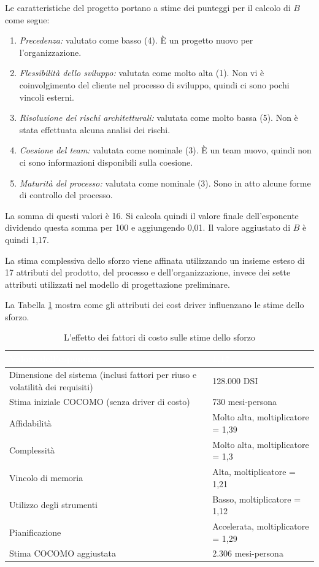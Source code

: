 Le caratteristiche del progetto portano a stime dei punteggi per il calcolo di $B$ come segue:
\begin{enumerate}
    \item \textit{Precedenza:} valutato come basso (4). È un progetto nuovo per l'organizzazione.
    \item \textit{Flessibilità dello sviluppo:} valutata come molto alta (1). Non vi è coinvolgimento del cliente nel processo di sviluppo, quindi ci sono pochi vincoli esterni.
    \item \textit{Risoluzione dei rischi architetturali:} valutata come molto bassa (5). Non è stata effettuata alcuna analisi dei rischi.
    \item \textit{Coesione del team:} valutata come nominale (3). È un team nuovo, quindi non ci sono informazioni disponibili sulla coesione.
    \item \textit{Maturità del processo:} valutata come nominale (3). Sono in atto alcune forme di controllo del processo.
\end{enumerate}
La somma di questi valori è 16. Si calcola quindi il valore finale dell'esponente dividendo questa somma per 100 e aggiungendo 0,01. Il valore aggiustato di $B$ è quindi 1,17.

La stima complessiva dello sforzo viene affinata utilizzando un insieme esteso di 17 attributi del prodotto, del processo e dell'organizzazione, invece dei sette attributi utilizzati nel modello di progettazione preliminare.

La Tabella \ref{tab:effect-cost-drivers-effort-estimates} mostra come gli attributi dei cost driver influenzano le stime dello sforzo. 

\begin{table}[ht]
\centering
{}
\begin{tabular}{|p{8cm}|p{5cm}|}
\hline
\rowcolor{headerblue}
\textbf{\textcolor{white}{Valore dell'esponente}} & \textbf{\textcolor{white}{1,17}}\\\hline
Dimensione del sistema (inclusi fattori per riuso e volatilità dei requisiti) & 128.000 DSI\\\hline
Stima iniziale COCOMO (senza driver di costo) & 730 mesi-persona\\\hline
Affidabilità & Molto alta, moltiplicatore = 1,39\\\hline
Complessità & Molto alta, moltiplicatore = 1,3\\\hline
Vincolo di memoria & Alta, moltiplicatore = 1,21\\\hline
Utilizzo degli strumenti & Basso, moltiplicatore = 1,12\\\hline
Pianificazione & Accelerata, moltiplicatore = 1,29\\\hline
Stima COCOMO aggiustata & 2.306 mesi-persona
\\\hline
\end{tabular}
\caption{L'effetto dei fattori di costo sulle stime dello sforzo}
\label{tab:effect-cost-drivers-effort-estimates}
\end{table}

